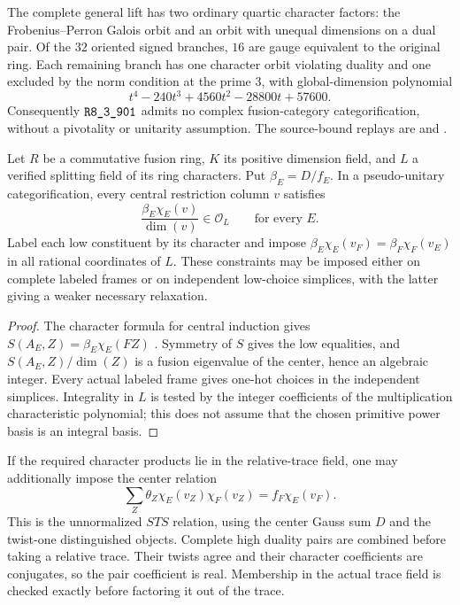 The complete general lift has two ordinary quartic character factors:
the Frobenius--Perron Galois orbit and an orbit with unequal dimensions
on a dual pair. Of the $32$ oriented signed branches, $16$ are gauge
equivalent to the original ring. Each remaining branch has one character
orbit violating duality and one excluded by the norm condition at the
prime $3$, with global-dimension polynomial
\[
 t^4-240t^3+4560t^2-28800t+57600.
\]
Consequently $\sha{R8_3_901}$ admits no complex fusion-category
categorification, without a pivotality or unitarity assumption.
The source-bound replays are
 and
.

\begin{proposition}
Let $R$ be a commutative fusion ring, $K$ its positive dimension field,
and $L$ a verified splitting field of its ring characters. Put
$\beta_E=D/f_E$. In a pseudo-unitary categorification, every central
restriction column $v$ satisfies
\[
 \frac{\beta_E\chi_E(v)}{\dim(v)}\in\mathcal O_L
 \qquad\text{for every }E.
\]
Label each low constituent by its character and impose
$\beta_E\chi_E(v_F)=\beta_F\chi_F(v_E)$ in all rational coordinates
of $L$. These constraints may be imposed either on complete labeled
frames or on independent low-choice simplices, with the latter giving
a weaker necessary relaxation.
\end{proposition}
\begin{proof}
The character formula for central induction gives
$S(A_E,Z)=\beta_E\chi_E(FZ)$
\cite[Lemma~4.3 and Corollary~4.5]{DeshpandeCenter}.
Symmetry of $S$ gives the low equalities, and
$S(A_E,Z)/\dim(Z)$ is a fusion eigenvalue of the center, hence an
algebraic integer. Every actual labeled frame gives one-hot choices
in the independent simplices. Integrality in $L$ is tested by the
integer coefficients of the multiplication characteristic polynomial;
this does not assume that the chosen primitive power basis is an
integral basis.
\end{proof}

If the required character products lie in the relative-trace field,
one may additionally impose the center relation
\[
 \sum_Z\theta_Z\chi_E(v_Z)\chi_F(v_Z)
   =f_F\chi_E(v_F).
\]
This is the unnormalized $STS$ relation, using the center Gauss sum
$D$ and the twist-one distinguished objects. Complete high duality
pairs are combined before taking a relative trace. Their twists agree
and their character coefficients are conjugates, so the pair
coefficient is real. Membership in the actual trace field is checked
exactly before factoring it out of the trace.



